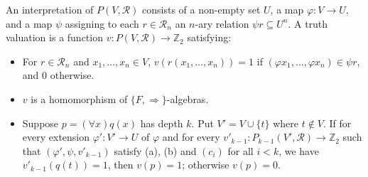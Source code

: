 An interpretation of $P(V, \mathcal{R})$ consists of a non-empty set $U$, a map $\varphi : V \to U$, and a map $\psi$ assigning to each $r \in \mathcal{R}_n$ an $n$-ary relation $\psi r \subseteq U^n$. A truth valuation is a function $v : P(V, \mathcal{R}) \to \mathbb{Z}_2$ satisfying:
\begin{itemize}
\item[(a)] For $r \in \mathcal{R}_n$ and $x_1, \ldots, x_n \in V$, $v(r(x_1, \ldots, x_n)) = 1$ if $(\varphi x_1, \ldots, \varphi x_n) \in \psi r$, and $0$ otherwise.
\item[(b)] $v$ is a homomorphism of $\{F, \Rightarrow\}$-algebras.
\item[$(c_k)$] Suppose $p = (\forall x)q(x)$ has depth $k$. Put $V' = V \cup \{t\}$ where $t \notin V$. If for every extension $\varphi' : V' \to U$ of $\varphi$ and for every $v'_{k-1} : P_{k-1}(V', \mathcal{R}) \to \mathbb{Z}_2$ such that $(\varphi', \psi, v'_{k-1})$ satisfy (a), (b) and $(c_i)$ for all $i < k$, we have $v'_{k-1}(q(t)) = 1$, then $v(p) = 1$; otherwise $v(p) = 0$.
\end{itemize}
